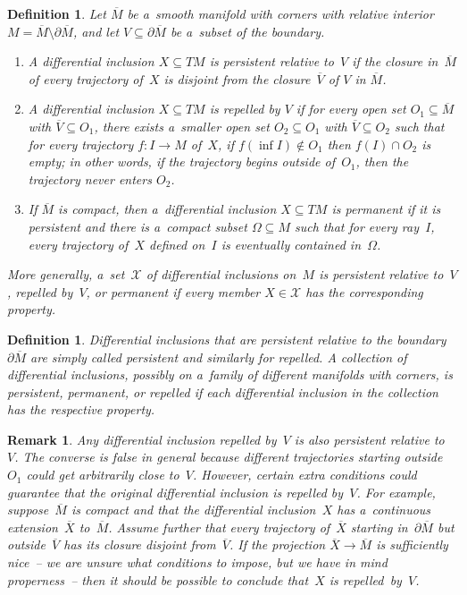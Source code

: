 \documentclass[pdftex]{sigma}
\newtheorem{Definition}[Theorem]{Definition}
\newtheorem{Remark}[Theorem]{Remark}
\newcommand\ol[1]{{\overline {#1}}}
\begin{document}
\begin{Definition}
\label{d:persistent}
Let $\ol{M}$ be a~smooth manifold with corners with relative interior $M=\ol M\setminus\partial\ol M$, and let
$V\subseteq\partial\ol M$ be a~subset of the boundary.
\begin{enumerate}\itemsep=0pt
\item A dif\/ferential inclusion $X\subseteq TM$ is \emph{persistent relative to~$V$} if the closure in~$\ol M$ of
every trajectory of~$X$ is disjoint from the closure~$\ol V$ of $V$ in $\ol M$.

\item A dif\/ferential inclusion $X\subseteq TM$ is \emph{repelled by $V$} if for every open set $O_1\subseteq\ol M$
with $\ol V\subseteq O_1$, there exists a~smaller open set $O_2\subseteq O_1$ with $\ol V\subseteq O_2$ such that for
every trajectory $f:I\to M$ of~$X$, if $f(\inf{I})\notin O_1$ then $f(I)\cap O_2$ is empty; in other words, if the
trajectory begins outside of~$O_1$, then the trajectory never enters $O_2$.

\item If $\ol M$ is compact, then a~dif\/ferential inclusion $X\subseteq TM$ is \emph{permanent} if it is persistent
and there is a~compact subset $\Omega\subseteq M$ such that for every ray~$I$, every trajectory of~$X$ def\/ined on~$I$
is eventually contained in~$\Omega$.
\end{enumerate}
More generally, a~set~$\mathcal X$ of dif\/ferential inclusions on~$M$ is \emph{persistent relative to~$V$},
\emph{repelled by~$V$}, or \emph{permanent} if every member $X\in\mathcal X$ has the corresponding property.
\end{Definition}
\begin{Definition}\label{d:persistent'}
Dif\/ferential inclusions that are persistent relative to the boundary $\partial\ol M$ are simply called
\emph{persistent} and similarly for \emph{repelled}.
A collection of dif\/ferential inclusions, possibly on a~family of dif\/ferent manifolds with corners, is
\emph{persistent}, \emph{permanent}, or \emph{repelled} if each dif\/ferential inclusion in the collection has the
respective property.
\end{Definition}
\begin{Remark}\label{r:repelled==>persistent}
Any dif\/ferential inclusion repelled by~$V$ is also persistent relative to~$V$.
The converse is false in general because dif\/ferent trajectories starting outside $O_1$ could get arbitrarily close
to~$V$.
However, certain extra conditions could guarantee that the original dif\/ferential inclusion is repelled by~$V$.
For example, suppose~$\ol M$ is compact and that the dif\/ferential inclusion~$X$ has a~continuous extension~$\ol X$
to~$\ol M$.
Assume further that every trajectory of~$\ol X$ starting in~$\partial\ol M$ but outside~$\ol V$ has its closure
disjoint from~$\ol V$.
If the projection $\ol X\to\ol M$ is suf\/f\/iciently nice~-- we are unsure what conditions to impose, but we have in
mind properness~-- then it should be possible to conclude that~$X$ is repelled~by~$V$.
\end{Remark}
\end{document}
